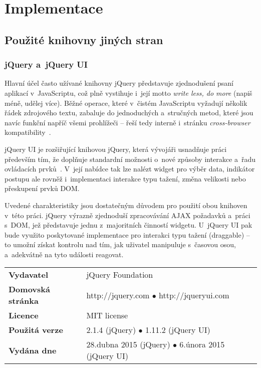 \graphicspath{{text/implementace/img/}}

\chapter{Implementace}
	\label{implementace}
	
	\section{Použité knihovny jiných stran}
		\label{pouzite-knihovny}
		\subsection{{\sf jQuery} a~{\sf jQuery UI}}
			\label{jquery-jquery-ui}
			
			Hlavní účel často užívané knihovny {\sf jQuery} představuje zjednodušení psaní aplikací v~JavaScriptu, což plně vystihuje i~její motto \emph{write less, do more} (napiš méně, udělej více). Běžné operace, které v~čistém JavaScriptu vyžadují několik řádek zdrojového textu, zabaluje do jednoduchých a~stručných metod, které jsou navíc funkční napříč všemi prohlížeči -- řeší tedy interně i~stránku \emph{cross-browser} kompatibility~\cite{w3c-jquery}.
			
			{\sf jQuery UI} je rozšiřující knihovou {\sf jQuery}, která vývojáři usnadňuje práci přede\-vším tím, že doplňuje standardní možnosti o~nové způsoby interakce a~řadu ovládacích prvků~\cite{jqueryui-2015}. V~její nabídce tak lze nalézt widget pro výběr data, indikátor postupu ale rovněž i~implementaci interakce typu tažení, změna velikosti nebo přeskupení prvků DOM.
			
			Uvedené charakteristiky jsou dostatečným důvodem pro použití obou knihoven v~této práci. {\sf jQuery} výrazně zjednoduší zpracovávání AJAX požadavků a~prá\-ci s~DOM, jež představuje jednu z~majoritních činností widgetu. U~{\sf jQuery UI} pak bude využito poskytované implementace pro interakci typu tažení (draggable) -- to umožní získat kontrolu nad tím, jak uživatel manipuluje s~časovou osou, a~adekvátně na tyto události reagovat.
			
			\vspace{\baselineskip}
			\renewcommand{\arraystretch}{1.3}
			\noindent
			\begin{tabularx}{\textwidth}{|lX|}
			\hline
			\bf Vydavatel & jQuery Foundation \\
			\bf Domovská stránka & http://jquery.com $\bullet$ http://jqueryui.com\\
			\bf Licence & MIT license \\
			\bf Použitá verze & 2.1.4 ({\sf jQuery}) $\bullet$ 1.11.2 ({\sf jQuery UI})\\
			\bf Vydána dne & 28.\ts dubna 2015 ({\sf jQuery}) $\bullet$ 6.\ts února 2015 ({\sf jQuery UI})\\
			\hline
			\end{tabularx}
		

